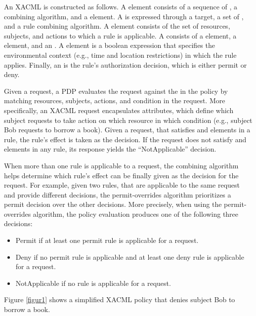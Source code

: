 An XACML is constructed as follows.
A  element consists of a sequence of , a combining algorithm, and
a  element. A  is expressed through a target, a set of , and a rule combining algorithm. 
A  element consists of the set of resources, subjects, and actions to which a rule is applicable. A  consists of a 
 element, a  element, and an . A  element is a boolean expression that specifies the
environmental context (e.g., time and location restrictions) in which the rule applies.
Finally, an  is the rule's authorization decision, which is either permit or deny.

Given a request, a PDP evaluates the request against the  in the policy by matching resources, subjects, actions, and condition in the request.
More specifically, an XACML request encapsulates attributes, which define which subject requests to take action on which resource in which
condition (e.g., subject Bob requests to borrow a book).
Given a request, that satisfies  and  elements in a rule, the rule's effect
is taken as the decision.
If the request does not satisfy  and  elements in any rule, its response yields the ``NotApplicable'' decision.

When more than one rule is applicable to a request, the combining algorithm helps determine which rule's effect can be finally given as the decision for the request.
For example, given two rules, that are applicable to the same request and provide different decisions,
the permit-overrides algorithm prioritizes a permit decision over the other decisions.
More precisely, when using the permit-overrides algorithm, the policy evaluation produces one of the following three decisions: 

\begin{itemize}
\item Permit if at least one permit rule is applicable for a request.
\item Deny if no permit rule is applicable and at least one deny rule is applicable for a request.
\item NotApplicable if no rule is applicable for a request.
\end{itemize}

Figure \ref{figur1} shows a simplified XACML policy that denies subject Bob to borrow a book.


